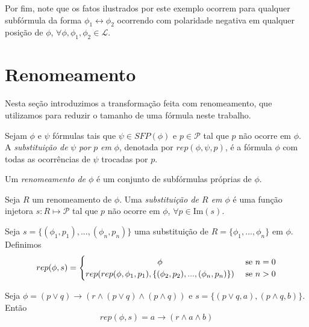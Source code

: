 \begin{example}
    Por fim, note que os fatos ilustrados por este exemplo ocorrem para qualquer subfórmula da forma $\phi_1 \leftrightarrow \phi_2$ ocorrendo com polaridade negativa em qualquer posição de $\phi$, $\forall \phi,\phi_1,\phi_2 \in \mathcal{L}$.
\end{example}

\section{Renomeamento}

\indent

Nesta seção introduzimos a transformação feita com renomeamento, que utilizamos para reduzir o tamanho de uma fórmula neste trabalho.

\begin{definition}
	Sejam $\phi$ e $\psi$ fórmulas tais que $\psi \in SFP(\phi)$ e $p \in \mathcal{P}$ tal que $p$ não ocorre em $\phi$. A \emph{substituição de} $\psi$ \emph{por} $p$ \emph{em} $\phi$, denotada por $rep(\phi,\psi,p)$, é a fórmula $\phi$ com todas as ocorrências de $\psi$ trocadas por $p$.
	
	Um \emph{renomeamento de $\phi$} é um conjunto de subfórmulas próprias de $\phi$.
	
	Seja $R$ um renomeamento de $\phi$. Uma \emph{substituição de $R$ em $\phi$} é uma função injetora $s : R \longmapsto \mathcal{P}$ tal que $p$ não ocorre em $\phi$, $\forall p \in \text{Im}(s)$.
	
	Seja $s = \{(\phi_1,p_1),...,(\phi_n,p_n) \}$ uma substituição de $R = \{\phi_1,...,\phi_n \}$ em $\phi$. Definimos
	\[
	rep(\phi,s) =
	\begin{cases} 
	\hfill \phi    \hfill & \text{ se $n=0$} \\
	\hfill rep(rep(\phi,\phi_1,p_1),\{(\phi_2,p_2),...,(\phi_n,p_n)\}) \hfill & \text{ se $n > 0$} \\
	\end{cases}
	\]
\end{definition}

\begin{example}
	Seja $\phi = (p \vee q) \rightarrow (r \wedge (p \vee q) \wedge (p \wedge q))$ e $s = \{(p \vee q,a),(p \wedge q,b)\}$. Então $$rep(\phi,s) = a \rightarrow (r \wedge a \wedge b)$$
\end{example}


